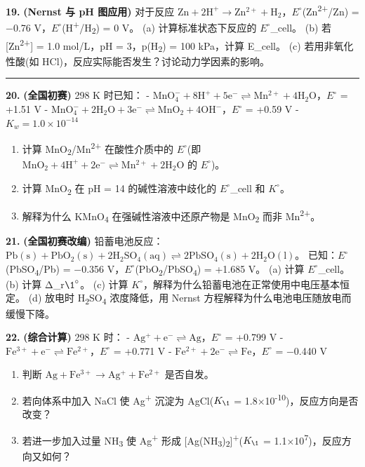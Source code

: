 \textbf{19.} \textbf{(Nernst 与 pH 图应用)} 对于反应 \(\mathrm{Zn + 2H^+ \to Zn^{2+} + H_2}\)，\(E^{\circ}\)(Zn\textsuperscript{2+}/Zn) = −0.76 V，\(E^{\circ}\)(H\textsuperscript{+}/H\textsubscript{2}) = 0 V。
(a) 计算标准状态下反应的 \(E^{\circ}\)\_cell。
(b) 若 {[}Zn\textsuperscript{2+}{]} = 1.0 mol/L，pH = 3，p(H\textsubscript{2}) = 100 kPa，计算 E\_cell。
(c) 若用非氧化性酸(如 HCl)，反应实际能否发生？讨论动力学因素的影响。

\begin{center}\rule{0.5\linewidth}{0.5pt}\end{center}

\textbf{20.} \textbf{(全国初赛)} 298 K 时已知：
- \(\mathrm{MnO_4^- + 8H^+ + 5e^- \rightleftharpoons Mn^{2+} + 4H_2O}\)，\(E^{\circ}\) = +1.51 V
- \(\mathrm{MnO_4^- + 2H_2O + 3e^- \rightleftharpoons MnO_2 + 4OH^-}\)，\(E^{\circ}\) = +0.59 V
- \(K_w = 1.0 \times 10^{-14}\)

\begin{enumerate}
\def\labelenumi{(\alph{enumi})}
\tightlist
\item
  计算 MnO\textsubscript{2}/Mn\textsuperscript{2+} 在酸性介质中的 \(E^{\circ}\)(即 \(\mathrm{MnO_2 + 4H^+ + 2e^- \rightleftharpoons Mn^{2+} + 2H_2O}\) 的 \(E^{\circ}\))。
\item
  计算 MnO\textsubscript{2} 在 pH = 14 的碱性溶液中歧化的 \(E^{\circ}\)\_cell 和 \(K^{\circ}\)。
\item
  解释为什么 KMnO\textsubscript{4} 在强碱性溶液中还原产物是 MnO\textsubscript{2} 而非 Mn\textsuperscript{2+}。
\end{enumerate}

\textbf{21.} \textbf{(全国初赛改编)} 铅蓄电池反应：\(\mathrm{Pb(s) + PbO_2(s) + 2H_2SO_4(aq) \rightleftharpoons 2PbSO_4(s) + 2H_2O(l)}\)。
已知：\(E^{\circ}\)(PbSO\textsubscript{4}/Pb) = −0.356 V，\(E^{\circ}\)(PbO\textsubscript{2}/PbSO\textsubscript{4}) = +1.685 V。
(a) 计算 \(E^{\circ}\)\_cell。
(b) 计算 Δ\_r\(\1^{\circ}\)。
(c) 计算 \(K^{\circ}\)，解释为什么铅蓄电池在正常使用中电压基本恒定。
(d) 放电时 H\textsubscript{2}SO\textsubscript{4} 浓度降低，用 Nernst 方程解释为什么电池电压随放电而缓慢下降。

\textbf{22.} \textbf{(综合计算)} 298 K 时：
- \(\mathrm{Ag^+ + e^- \rightleftharpoons Ag}\)，\(E^{\circ}\) = +0.799 V
- \(\mathrm{Fe^{3+} + e^- \rightleftharpoons Fe^{2+}}\)，\(E^{\circ}\) = +0.771 V
- \(\mathrm{Fe^{2+} + 2e^- \rightleftharpoons Fe}\)，\(E^{\circ}\) = −0.440 V

\begin{enumerate}
\def\labelenumi{(\alph{enumi})}
\tightlist
\item
  判断 \(\mathrm{Ag + Fe^{3+} \to Ag^+ + Fe^{2+}}\) 是否自发。
\item
  若向体系中加入 NaCl 使 Ag\textsuperscript{+} 沉淀为 AgCl(\(K_{\1}\) = 1.8×10\textsuperscript{-10})，反应方向是否改变？
\item
  若进一步加入过量 NH\textsubscript{3} 使 Ag\textsuperscript{+} 形成 {[}Ag(NH\textsubscript{3})\textsubscript{2}{]}\textsuperscript{+}(\(K_{\1}\) = 1.1×10\textsuperscript{7})，反应方向又如何？
\end{enumerate}

